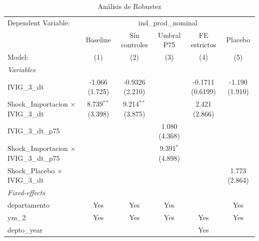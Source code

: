 \documentclass[12pt]{article}
\begin{document}
\setcounter{table}{12}
\begin{table}[htbp]
\centering
\begin{threeparttable}

   \caption{Análisis de Robustez}
   \centering
   \small
   \begin{tabular}{lccccc}
      \tabularnewline \midrule \midrule
      Dependent Variable: & \multicolumn{5}{c}{ind\_prod\_nominal}\\
                                                        & Baseline             & Sin controles        & Umbral P75          & FE estrictos       & Placebo \\   
      Model:                                            & (1)                  & (2)                  & (3)                 & (4)                & (5)\\  
      \midrule
      \emph{Variables}\\
      IVIG\_3\_dt                                       & -1.066 (1.725)       & -0.9326 (2.210)      &                     & -0.1711 (0.6199)   & -1.190 (1.910)\\   
      Shock\_Importacion $\times$ IVIG\_3\_dt           & 8.739$^{**}$ (3.398) & 9.214$^{**}$ (3.875) &                     & 2.421 (2.866)      &   \\   
      IVIG\_3\_dt\_p75                                  &                      &                      & 1.080 (4.368)       &                    &   \\   
      Shock\_Importacion $\times$ IVIG\_3\_dt\_p75      &                      &                      & 9.391$^{*}$ (4.898) &                    &   \\   
      Shock\_Placebo $\times$ IVIG\_3\_dt               &                      &                      &                     &                    & 1.773 (2.864)\\   
      \midrule
      \emph{Fixed-effects}\\
      departamento                                      & Yes                  & Yes                  & Yes                 &                    & Yes\\  
      ym\_2                                             & Yes                  & Yes                  & Yes                 & Yes                & Yes\\  
      depto\_year                                       &                      &                      &                     & Yes                & \\  

\end{tabular}
\end{threeparttable}
\end{table}
\end{document}
